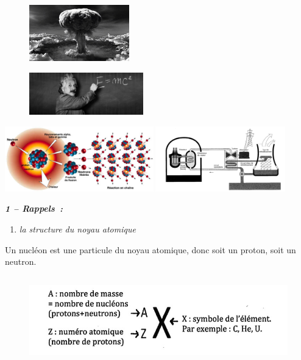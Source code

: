 \begin{figure}
\centering
\includegraphics[width=4.35cm,height=2.439cm]{Pictures/100000000000028A0000016D9B2BB1B3B682BBBA.jpg}
\caption{}
\end{figure}

\begin{figure}
\centering
\includegraphics[width=4.942cm,height=1.831cm]{Pictures/100000000000032A0000012C7D9EB773B1A5CFD2.jpg}
\caption{}
\end{figure}

\includegraphics[width=6.451cm,height=2.836cm]{Pictures/1000000000000258000001081538D49477005002.jpg}\includegraphics[width=5.801cm,height=2.82cm]{Pictures/1000000000000703000003811303CD635F28D921.png}

\emph{\textbf{1 -- Rappels~:}}

\emph{\textbf{ }}

\begin{enumerate}
\def\labelenumi{\alph{enumi})}
\tightlist
\item
  \emph{la structure du noyau atomique}
\end{enumerate}

Un nucléon est une particule du noyau atomique, donc soit un proton,
soit un neutron.

\begin{figure}
\centering
\includegraphics[width=14.063cm,height=3.81cm]{Pictures/10000000000002DD000000C657B445FAE2BE03DE.jpg}
\caption{}
\end{figure}

